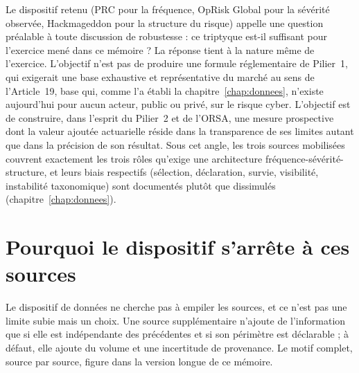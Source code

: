 
Le dispositif retenu (PRC pour la fréquence, OpRisk Global pour la
sévérité observée, Hackmageddon pour la structure du risque) appelle une
question préalable à toute discussion de robustesse : ce triptyque est-il
suffisant pour l'exercice mené dans ce mémoire ? La réponse tient à la nature
même de l'exercice. L'objectif n'est pas de produire une formule
réglementaire de Pilier~1, qui exigerait une base exhaustive et représentative
du marché au sens de l'Article~19, base qui, comme l'a établi la
chapitre~\ref{chap:donnees}, n'existe aujourd'hui pour aucun acteur, public ou privé, sur le
risque cyber. L'objectif est de construire, dans l'esprit du Pilier~2 et de
l'ORSA, une mesure prospective dont la valeur ajoutée actuarielle réside dans
la transparence de ses limites autant que dans la précision de son résultat.
Sous cet angle, les trois sources mobilisées couvrent exactement les trois
rôles qu'exige une architecture fréquence-sévérité-structure, et leurs biais
respectifs (sélection, déclaration, survie, visibilité, instabilité
taxonomique) sont documentés plutôt que dissimulés (chapitre~\ref{chap:donnees}).


\section{Pourquoi le dispositif s'arrête à ces sources}
Le dispositif de données ne cherche pas à empiler les sources, et ce n'est pas une
limite subie mais un choix. Une source supplémentaire n'ajoute de l'information que si
elle est indépendante des précédentes et si son périmètre est déclarable ; à défaut,
elle ajoute du volume et une incertitude de provenance. Le motif complet, source par
source, figure dans la version longue de ce mémoire.

